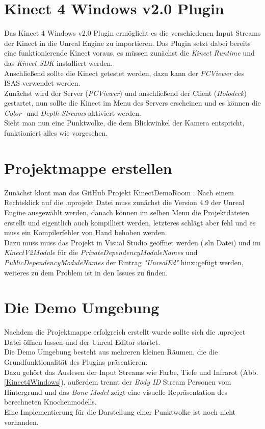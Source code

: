 \documentclass[a4paper]{IEEEtran}
\begin{document}
	
\section{Kinect 4 Windows v2.0 Plugin}
	Das Kinect 4 Windows v2.0 Plugin ermöglicht es die verschiedenen Input Streams der Kinect in die Unreal Engine zu importieren. Das Plugin setzt dabei bereits eine funktionierende Kinect voraus, es müssen zunächst die {\textit{Kinect Runtime}} {\cite{kinectruntime}} und das {\textit{Kinect SDK}} {\cite{kinectsdk}} installiert werden. \\
	Anschließend sollte die Kinect getestet werden, dazu kann der {\textit{PCViewer}} des ISAS verwendet werden. \\
	Zunächst wird der Server ({\textit{PCViewer}}) und anschließend der Client ({\textit{Holodeck}}) gestartet, nun sollte die Kinect im Menu des Servers erscheinen und es können die {\textit{Color-}} und {\textit{Depth-Streams}} aktiviert werden. \\
	Sieht man nun eine Punktwolke, die dem Blickwinkel der Kamera entspricht, funktioniert alles wie vorgesehen.\\
	

\section{Projektmappe erstellen}
	Zunächst klont man das GitHub Projekt KinectDemoRoom {\cite{k4w}}. 
	Nach einem Rechtsklick auf die .uprojekt Datei muss zunächst die Version 4.9 der Unreal Engine ausgewählt werden, danach können im selben Menu die Projektdateien erstellt und eigentlich auch kompilliert werden, letzteres schlägt aber fehl und es muss ein Kompilerfehler von Hand behoben werden. \\
	Dazu muss muss das Projekt in Visual Studio geöffnet werden (.sln Datei) und  im {\textit{KinectV2Module}} für die {\textit{PrivateDependencyModuleNames}} und {\textit{PublicDependencyModuleNames}} der Eintrag {\textit{"{}UnrealEd"{}}} hinzugefügt werden, weiteres zu dem Problem ist in den Issues {\cite{k4wissues}} zu finden.\\

\section{Die Demo Umgebung}
	Nachdem die Projektmappe erfolgreich erstellt wurde sollte sich die .uproject Datei öffnen lassen und der Unreal Editor startet. \\
	Die Demo Umgebung besteht aus mehreren kleinen Räumen, die die Grundfunktionalität des Plugins präsentieren. \\
	Dazu gehört das Auslesen der Input Streams wie Farbe, Tiefe und Infrarot (Abb. \ref{Kinect4Windows}), außerdem trennt der {\textit{Body ID}} Stream Personen vom Hintergrund und das {\textit{Bone Model}} zeigt eine visuelle Repräsentation des berechneten Knochenmodells. \\
	Eine Implementierung für die Darstellung einer Punktwolke ist noch nicht vorhanden. \\[0.5cm]
	
\end{document}
